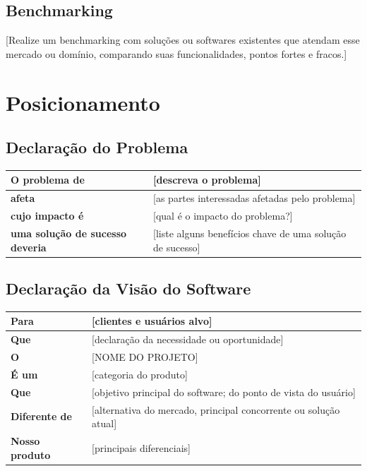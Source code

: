 \documentclass[12pt,a4paper]{report}
\newcommand{\projetoNome}{[NOME DO PROJETO]}
\begin{document}
\section{Benchmarking}
[Realize um benchmarking com soluções ou softwares existentes que atendam esse mercado ou domínio, comparando suas funcionalidades, pontos fortes e fracos.]

\chapter{Posicionamento}

\section{Declaração do Problema}
\begin{center}
\begin{tabularx}{\textwidth}{|l|X|}
    \hline
    \textbf{O problema de} & [descreva o problema] \\ \hline
    \textbf{afeta} & [as partes interessadas afetadas pelo problema] \\ \hline
    \textbf{cujo impacto é} & [qual é o impacto do problema?] \\ \hline
    \textbf{uma solução de sucesso deveria} & [liste alguns benefícios chave de uma solução de sucesso] \\ \hline
\end{tabularx}
\end{center}

\section{Declaração da Visão do Software}
\begin{center}
\begin{tabularx}{\textwidth}{|l|X|}
    \hline
    \textbf{Para} & [clientes e usuários alvo] \\ \hline
    \textbf{Que} & [declaração da necessidade ou oportunidade] \\ \hline
    \textbf{O} & \projetoNome \\ \hline
    \textbf{É um} & [categoria do produto] \\ \hline
    \textbf{Que} & [objetivo principal do software; do ponto de vista do usuário] \\ \hline
    \textbf{Diferente de} & [alternativa do mercado, principal concorrente ou solução atual] \\ \hline
    \textbf{Nosso produto} & [principais diferenciais] \\ \hline
\end{tabularx}
\end{center}
\end{document}
